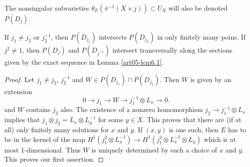 The nonsingular subvarieties $\theta_{E}(\pi^{-1}(X\times j))\subset
U_{X}$ will also be denoted $P(D_{j})$.

\begin{proposition}\label{art05-prop6.19}
If $j_{1}\neq j_{2}$ or $j^{-1}_{2}$, then $P(D_{j_{1}})$ intersects
$P(D_{j_{2}})$ in only finitely many poins. If $j^{2}\neq 1$, then
$P(D_{j})$ and $P(D_{j^{-1}})$ intersect transversally along the sections
given by the exact sequence in Lemma \ref{art05-lem6.1}. 
\end{proposition}

\begin{proof}
Let $j_{1}\neq j_{2}$, $j^{-1}_{2}$ and $W\in P(D_{j_{1}})\cap
P(D_{j_{2}})$. Then $W$ is given by an extension
$$
0\to j_{1}\to W\to j_{1}^{-1}\otimes L_{x}\to 0.
$$
and $W$ contains $j_{2}$ also. The existence of a nonzero homomorphism
$j_{2}\to j^{-1}_{1}\otimes L_{x}$ implies that $j_{1}\otimes
j_{2}=L_{x}\otimes L_{y}^{-1}$ for some $y\in X$. This proves that
there are (if at all) only finitely many solutions for $x$ and $y$. If
$(x,y)$ is one such, then $E$ has to be in the kernel of the map
$H^{1}(j^{2}_{1}\otimes L_{x}^{-1})\to H^{1}(j^{2}_{1}\otimes
L_{x}^{-1}\otimes L_{y})$ which is at most 1-dimensional. Thus $W$ is
uniquely determined by such a choice of $x$ and $y$. This proves our
first assertion.


\end{proof}
